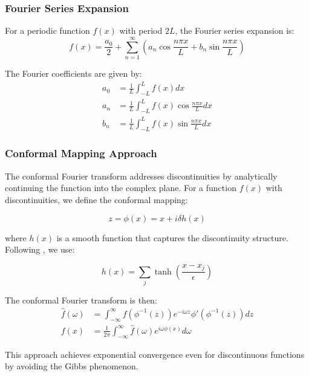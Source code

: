 \documentclass[11pt,twocolumn]{article}
\begin{document}
\subsubsection{Fourier Series Expansion}

For a periodic function $f(x)$ with period $2L$, the Fourier series expansion is:
\begin{equation}
f(x) = \frac{a_0}{2} + \sum_{n=1}^{\infty} \left( a_n \cos\frac{n\pi x}{L} + b_n \sin\frac{n\pi x}{L} \right)
\end{equation}

The Fourier coefficients are given by:
\begin{align}
a_0 &= \frac{1}{L} \int_{-L}^{L} f(x) dx \\
a_n &= \frac{1}{L} \int_{-L}^{L} f(x) \cos\frac{n\pi x}{L} dx \\
b_n &= \frac{1}{L} \int_{-L}^{L} f(x) \sin\frac{n\pi x}{L} dx
\end{align}

\subsubsection{Conformal Mapping Approach}

The conformal Fourier transform addresses discontinuities by analytically continuing the function into the complex plane. For a function $f(x)$ with discontinuities, we define the conformal mapping:

\begin{equation}
z = \phi(x) = x + i\delta h(x)
\end{equation}

where $h(x)$ is a smooth function that captures the discontinuity structure. Following \citet{barnett2010conformal}, we use:

\begin{equation}
h(x) = \sum_{j} \tanh\left(\frac{x - x_j}{\epsilon}\right)
\end{equation}

The conformal Fourier transform is then:
\begin{align}
\hat{f}(\omega) &= \int_{-\infty}^{\infty} f(\phi^{-1}(z)) e^{-i\omega z} \phi'(\phi^{-1}(z)) dz \label{eq:cft_forward} \\
f(x) &= \frac{1}{2\pi} \int_{-\infty}^{\infty} \hat{f}(\omega) e^{i\omega \phi(x)} d\omega \label{eq:cft_inverse}
\end{align}

This approach achieves exponential convergence even for discontinuous functions by avoiding the Gibbs phenomenon.
\end{document}
